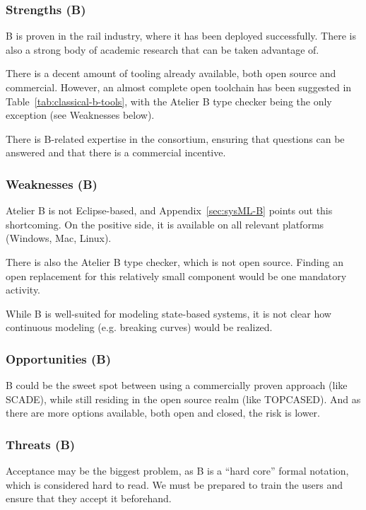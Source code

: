 \subsubsection{Strengths (B)}

B is proven in the rail industry, where it has been deployed successfully.  There is also a strong body of academic research that can be taken advantage of.

There is a decent amount of tooling already available, both open source and commercial.  However, an almost complete open toolchain has been suggested in Table~\ref{tab:classical-b-tools}, with the Atelier B type checker being the only exception (see Weaknesses below).

There is B-related expertise in the consortium, ensuring that questions can be answered and that there is a commercial incentive.

\subsubsection{Weaknesses (B)}

Atelier B is not Eclipse-based, and Appendix~\ref{sec:sysML-B} points out this shortcoming.  On the positive side, it is available on all relevant platforms (Windows, Mac, Linux).

There is also the Atelier B type checker, which is not open source.  Finding an open replacement for this relatively small component would be one mandatory activity.

While B is well-suited for modeling state-based systems, it is not clear how continuous modeling (e.g. breaking curves) would be realized.


\subsubsection{Opportunities (B)}

B could be the sweet spot between using a commercially proven approach (like SCADE), while still residing in the open source realm (like TOPCASED).  And as there are more options available, both open and closed, the risk is lower.

\subsubsection{Threats (B)}

Acceptance may be the biggest problem, as B is a ``hard core'' formal notation, which is considered hard to read.  We must be prepared to train the users and ensure that they accept it beforehand.

